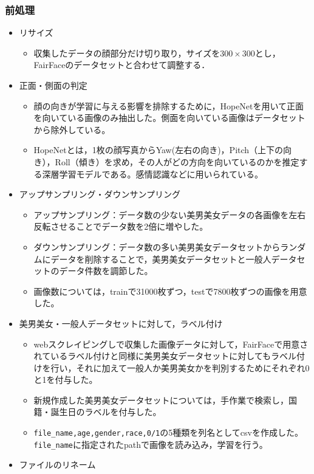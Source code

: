 \documentclass[a4paper,11pt,titlepage]{jsarticle}
\begin{document}
\subsubsection{前処理}
\begin{itemize}
    \item リサイズ
        \begin{itemize}
            \item 収集したデータの顔部分だけ切り取り，サイズを$300 \times 300$とし，FairFaceのデータセットと合わせて調整する．
        \end{itemize}
    \item 正面・側面の判定
        \begin{itemize}
            \item 顔の向きが学習に与える影響を排除するために，HopeNetを用いて正面を向いている画像のみ抽出した。側面を向いている画像はデータセットから除外している。
            \item HopeNetとは，1枚の顔写真からYaw(左右の向き)，Pitch（上下の向き），Roll（傾き）を求め，その人がどの方向を向いているのかを推定する深層学習モデルである。感情認識などに用いられている。
        \end{itemize}
    \item アップサンプリング・ダウンサンプリング
        \begin{itemize}
            \item アップサンプリング：データ数の少ない美男美女データの各画像を左右反転させることでデータ数を2倍に増やした。
            \item ダウンサンプリング：データ数の多い美男美女データセットからランダムにデータを削除することで，美男美女データセットと一般人データセットのデータ件数を調節した。
            \item 画像数については，trainで31000枚ずつ，testで7800枚ずつの画像を用意した。
        \end{itemize}
    \item 美男美女・一般人データセットに対して，ラベル付け
        \begin{itemize}
            \item webスクレイピングしで収集した画像データに対して，FairFaceで用意されているラベル付けと同様に美男美女データセットに対してもラベル付けを行い，それに加えて一般人か美男美女かを判別するためにそれぞれ0と1を付与した。
            \item 新規作成した美男美女データセットについては，手作業で検索し，国籍・誕生日のラベルを付与した。
            \item \texttt{file\_name,age,gender,race,0/1}の5種類を列名としてcsvを作成した。\texttt{file\_name}に指定されたpathで画像を読み込み，学習を行う。
        \end{itemize}
    \item ファイルのリネーム
\end{itemize}
\end{document}
